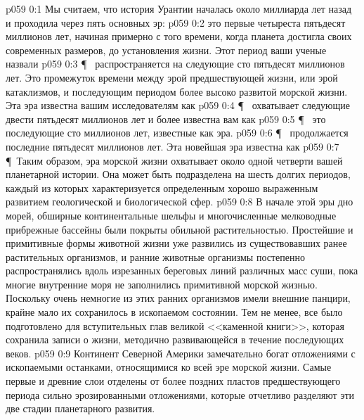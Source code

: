 \vs p059 0:1 Мы считаем, что история Урантии началась около миллиарда лет назад и проходила через пять основных эр:
\vs p059 0:2 \bibnobreakspace {} это первые четыреста пятьдесят миллионов лет, начиная примерно с того времени, когда планета достигла своих современных размеров, до установления жизни. Этот период ваши ученые назвали 
\vs p059 0:3 \P\ \bibnobreakspace {} распространяется на следующие сто пятьдесят миллионов лет. Это промежуток времени между эрой предшествующей жизни, или эрой катаклизмов, и последующим периодом более высоко развитой морской жизни. Эта эра известна вашим исследователям как 
\vs p059 0:4 \P\ \bibnobreakspace {} охватывает следующие двести пятьдесят миллионов лет и более известна вам как 
\vs p059 0:5 \P\ \bibnobreakspace {} это последующие сто миллионов лет, известные как  эра.
\vs p059 0:6 \P\ \bibnobreakspace {} продолжается последние пятьдесят миллионов лет. Эта новейшая эра известна как 
\vs p059 0:7 \P\ Таким образом, эра морской жизни охватывает около одной четверти вашей планетарной истории. Она может быть подразделена на шесть долгих периодов, каждый из которых характеризуется определенным хорошо выраженным развитием геологической и биологической сфер.
\vs p059 0:8 В начале этой эры дно морей, обширные континентальные шельфы и многочисленные мелководные прибрежные бассейны были покрыты обильной растительностью. Простейшие и примитивные формы животной жизни уже развились из существовавших ранее растительных организмов, и ранние животные организмы постепенно распространялись вдоль изрезанных береговых линий различных масс суши, пока многие внутренние моря не заполнились примитивной морской жизнью. Поскольку очень немногие из этих ранних организмов имели внешние панцири, крайне мало их сохранилось в ископаемом состоянии. Тем не менее, все было подготовлено для вступительных глав великой <<каменной книги>>, которая сохранила записи о жизни, методично развивающейся в течение последующих веков.
\vs p059 0:9 Континент Северной Америки замечательно богат отложениями с ископаемыми останками, относящимися ко всей эре морской жизни. Самые первые и древние слои отделены от более поздних пластов предшествующего периода сильно эрозированными отложениями, которые отчетливо разделяют эти две стадии планетарного развития.
